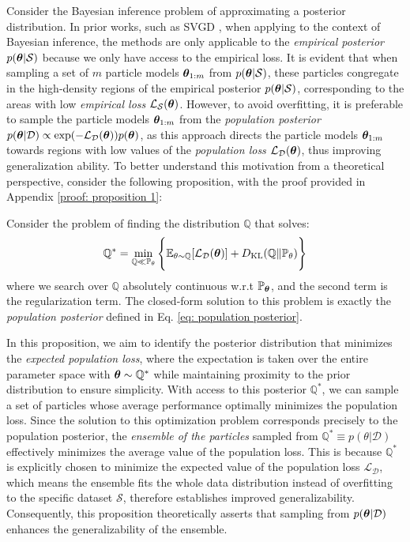 Consider the Bayesian inference problem of approximating a posterior distribution. In prior works, such as SVGD \citep{svgd}, when applying to the context of Bayesian inference, the methods are only applicable to the \textit{empirical posterior} $p({\bm{\theta}}|{\mathcal{S}})$ because we only have access to the empirical loss. It is evident that when sampling a set of $m$ particle models ${\bm{\theta}}_{1:m}$ from $p({\bm{\theta}}|{\mathcal{S}})$, these particles congregate in the high-density regions of the empirical posterior $p({\bm{\theta}}|{\mathcal{S}})$, corresponding to the areas with low \textit{empirical loss} ${\mathcal{L}}_{\mathcal{S}}({\bm{\theta}})$. However, to avoid overfitting, it is preferable to sample the particle models ${\bm{\theta}}_{1:m}$ from the \textit{population posterior} $p({\bm{\theta}}| {\mathcal{D}}) \propto \exp(-   {\mathcal{L}}_{\mathcal{D}}({\bm{\theta}}))p({\bm{\theta}})$, as this approach directs the particle models ${\bm{\theta}}_{1:m}$ towards regions with low values of the \textit{population loss} ${\mathcal{L}}_{\mathcal{D}}({\bm{\theta}})$, thus improving generalization ability. To better understand this motivation from a theoretical perspective, consider the following proposition, with the proof provided in Appendix \ref{proof: proposition 1}:
\begin{proposition}
    \label{proposition 1}
    Consider the problem of finding the distribution $\mathbb{Q}$ that solves:
    \begin{equation}
        \mathbb{Q}^* = \min_{\mathbb{Q} \ll \mathbb{P}_{\mathbf{\theta}}} \Bigg\{\mathbb{E}_{\theta \sim \mathbb{Q}}[\mathcal{L}_\mathcal{D}({\bm{\theta}})] + D_{\mathrm{KL}}(\mathbb{Q} \| \mathbb{P}_{\mathbf{\theta}}) \Bigg\}
    \end{equation}
    where we search over $\mathbb{Q}$ absolutely continuous w.r.t $\mathbb{P}_{\bm{\theta}}$, and the second term is the regularization term. The closed-form solution to this problem is exactly the \textit{population posterior} defined in Eq. \ref{eq: population posterior}.
\end{proposition}

In this proposition, we aim to identify the posterior distribution that minimizes the \textit{expected population loss}, where the expectation is taken over the entire parameter space with ${\bm{\theta}} \sim \mathbb{Q}^*$ while maintaining proximity to the prior distribution to ensure simplicity. With access to this posterior $\mathbb{Q}^*$, we can sample a set of particles whose average performance optimally minimizes the population loss. Since the solution to this optimization problem corresponds precisely to the population posterior, the \textit{ensemble of the particles} sampled from $ \mathbb{Q}^* \equiv p(\theta|\mathcal{D})$ effectively minimizes the average value of the population loss. This is because $\mathbb{Q}^* $ is explicitly chosen to minimize the expected value of the population loss $ \mathcal{L}_\mathcal{D}$, which means the ensemble fits the whole data distribution instead of overfitting to the specific dataset $\mathcal{S}$, therefore establishes improved generalizability. Consequently, this proposition theoretically asserts that sampling from $p({\bm{\theta}} | \mathcal{D})$ enhances the generalizability of the ensemble.

